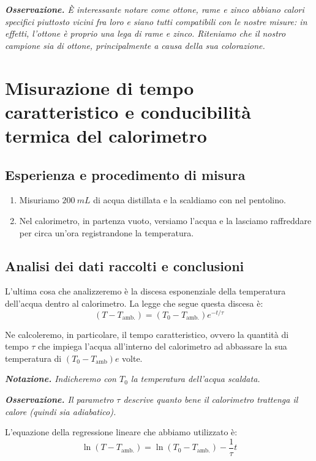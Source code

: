 \documentclass{article}
\begin{document}
\emph{
    \textbf{Osservazione.}
    È interessante notare come ottone, rame e zinco abbiano calori specifici piuttosto vicini
    fra loro e siano tutti compatibili con le nostre misure: in effetti, l'ottone è proprio
    una lega di rame e zinco. Riteniamo che il nostro campione sia di ottone, principalmente
    a causa della sua colorazione.
}

\section{Misurazione di tempo caratteristico e conducibilità termica del calorimetro}

\subsection{Esperienza e procedimento di misura}

\begin{enumerate}
    \item
        Misuriamo $\qty{200}{mL}$ di acqua distillata e la scaldiamo con nel
        pentolino.    %
    \item
        Nel calorimetro, in partenza vuoto, versiamo l'acqua e la lasciamo
        raffreddare per circa un'ora registrandone la temperatura.
\end{enumerate}

\subsection{Analisi dei dati raccolti e conclusioni}
L'ultima cosa che analizzeremo è la discesa esponenziale della temperatura    %
dell'acqua dentro al calorimetro. La legge che segue questa discesa è:
\[
    (T-T_\text{amb.})=(T_0-T_\text{amb.}) e^{-t/\tau}
\]

Ne calcoleremo, in particolare, il tempo caratteristico, ovvero la quantità
di tempo $\tau$ che impiega l'acqua all'interno del calorimetro ad abbassare
la sua temperatura di $(T_0 - T_\text{amb})e$ volte.

\emph{
    \textbf{Notazione.} Indicheremo con $T_0$ la temperatura
    dell'acqua scaldata.
}

\emph{
    \textbf{Osservazione.} Il parametro $\tau$ descrive quanto bene il
    calorimetro trattenga il calore (quindi sia adiabatico).
}

L'equazione della regressione lineare che abbiamo utilizzato è:
\[
    \ln(T-T_\text{amb.})=\ln(T_0-T_\text{amb.})-\frac{1}{\tau}t
\]
\end{document}

